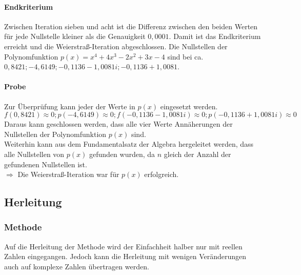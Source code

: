 \documentclass[12pt]{article}
\begin{document}
\paragraph{Endkriterium}
Zwischen Iteration sieben und acht ist die Differenz zwischen den beiden Werten für jede Nullstelle kleiner als die Genauigkeit $0,0001$. Damit ist das Endkriterium erreicht und die Weierstraß-Iteration abgeschlossen. 
Die Nullstellen der Polynomfunktion $p(x) = x^4 + 4x^3 - 2x^2 + 3x - 4$ sind bei ca. $0,8421; -4,6149; -0,1136 - 1,0081i; -0,1136 + 1,0081$. 
\paragraph{Probe}
Zur Überprüfung kann jeder der Werte in $p(x)$ eingesetzt werden.
\begin{displaymath}
    f(0,8421) \approx 0; p(-4,6149) \approx 0; f(-0,1136 - 1,0081i) \approx 0; p(-0,1136 + 1,0081i) \approx 0
\end{displaymath}
Daraus kann geschlossen werden, dass alle vier Werte Annäherungen der Nullstellen der Polynomfunktion $p(x)$ sind. \\
Weiterhin kann aus dem Fundamentalsatz der Algebra hergeleitet werden, dass alle Nullstellen von $p(x)$ gefunden wurden, da $n$ gleich der Anzahl der gefundenen Nullstellen ist. \\
$\Rightarrow$ Die Weierstraß-Iteration war für $p(x)$ erfolgreich.

\subsection{Herleitung}
\subsubsection{Methode}
Auf die Herleitung der Methode wird der Einfachheit halber nur mit reellen Zahlen eingegangen. Jedoch kann die Herleitung mit wenigen Veränderungen auch auf komplexe Zahlen übertragen werden.
\end{document}
